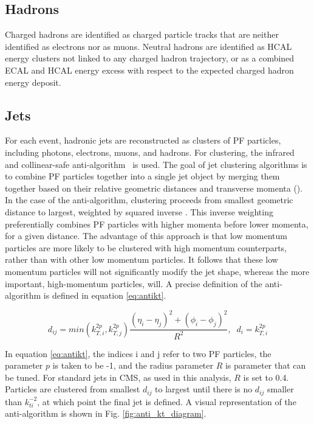 \subsection{Hadrons}
Charged hadrons are identified as charged particle tracks that are neither identified as electrons nor as muons. Neutral hadrons are identified as HCAL energy clusters not linked to any charged hadron trajectory, or as a combined ECAL and HCAL energy excess with respect to the expected charged hadron energy deposit.

\subsection{Jets}
For each event, hadronic jets are reconstructed as clusters of PF particles, including photons, electrons, muons, and hadrons. For clustering, the infrared and collinear-safe anti-\kt algorithm~\cite{Cacciari:2008gp, Cacciari:2011ma} is used. The goal of jet clustering algorithms is to combine PF particles together into a single jet object by merging them together based on their relative geometric distances and transverse momenta (\kt). In the case of the anti-\kt algorithm, clustering proceeds from smallest geometric distance to largest, weighted by squared inverse \kt. This inverse weighting 
preferentially combines PF particles with higher momenta before lower momenta, for a given distance. The advantage of this approach is that low momentum particles are more likely to be clustered 
with high momentum counterparts, rather than with other low momentum particles. It follows that these low momentum particles will not significantly modify the jet shape, whereas the more important, high-momentum particles, will. A precise definition of the anti-\kt algorithm is defined in equation \ref{eq:antikt}. 

\begin{equation}
	d_{ij} = min(k_{T,i}^{2p}, k_{T,j}^{2p})\frac{(\eta_i - \eta_j)^2 + (\phi_i - \phi_j)^2}{R^2},\;\; d_i = k_{T,i}^{2p}
	\label{eq:antikt}
\end{equation}

In equation \ref{eq:antikt}, the indices i and j refer to two PF particles, the parameter $p$ is taken to be -1, and the radius parameter $R$ is parameter that can be tuned. For standard jets in CMS, as used in this analysis, $R$ is set to 0.4. Particles are clustered from smallest $d_{ij}$ to largest until there is no $d_{ij}$ smaller than $k_{ti}^{-2}$, at which point the final jet is defined. A visual representation of the anti-\kt algorithm is shown in Fig. \ref{fig:anti_kt_diagram}.


